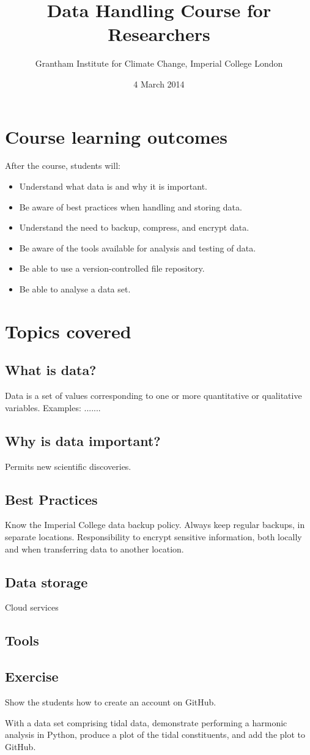 \documentclass[a4paper,11pt]{article}
\title{Data Handling Course for Researchers}
\date{4 March 2014}
\author{Grantham Institute for Climate Change, Imperial College London}
\begin{document}
\maketitle
\setlength{\parskip}{0.3cm}
\setlength{\parindent}{0cm}

\section{Course learning outcomes}
After the course, students will:
\begin{itemize}
   \item Understand what data is and why it is important.
   \item Be aware of best practices when handling and storing data.
   \item Understand the need to backup, compress, and encrypt data.
   \item Be aware of the tools available for analysis and testing of data.
   \item Be able to use a version-controlled file repository.
   \item Be able to analyse a data set.
\end{itemize}

\section{Topics covered}

\subsection{What is data?}
Data is a set of values corresponding to one or more quantitative or qualitative variables. Examples: .......

\subsection{Why is data important?}
Permits new scientific discoveries.

\subsection{Best Practices}
Know the Imperial College data backup policy.
Always keep regular backups, in separate locations.
Responsibility to encrypt sensitive information, both locally and when transferring data to another location.

\subsection{Data storage}

Cloud services 

\subsection{Tools}


\subsection{Exercise}
Show the students how to create an account on GitHub.

With a data set comprising tidal data, demonstrate performing a harmonic analysis in Python, produce a plot of the tidal constituents, and add the plot to GitHub.
\end{document}
